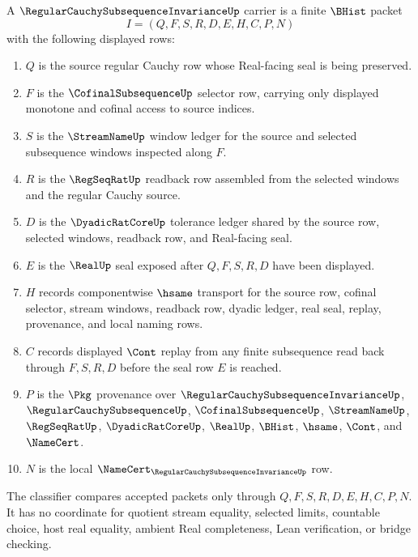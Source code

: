 \begin{definition}
\label{def:regular-cauchy-subsequence-invariance-carrier}
A $\RegularCauchySubsequenceInvarianceUp$ carrier is a finite $\BHist$ packet
$$
I=(Q,F,S,R,D,E,H,C,P,N)
$$
with the following displayed rows:
\begin{enumerate}
\item $Q$ is the source regular Cauchy row whose Real-facing seal is being preserved.
\item $F$ is the $\CofinalSubsequenceUp$ selector row, carrying only displayed monotone and cofinal access to source indices.
\item $S$ is the $\StreamNameUp$ window ledger for the source and selected subsequence windows inspected along $F$.
\item $R$ is the $\RegSeqRatUp$ readback row assembled from the selected windows and the regular Cauchy source.
\item $D$ is the $\DyadicRatCoreUp$ tolerance ledger shared by the source row, selected windows, readback row, and Real-facing seal.
\item $E$ is the $\RealUp$ seal exposed after $Q,F,S,R,D$ have been displayed.
\item $H$ records componentwise $\hsame$ transport for the source row, cofinal selector, stream windows, readback row, dyadic ledger, real seal, replay, provenance, and local naming rows.
\item $C$ records displayed $\Cont$ replay from any finite subsequence read back through $F,S,R,D$ before the seal row $E$ is reached.
\item $P$ is the $\Pkg$ provenance over $\RegularCauchySubsequenceInvarianceUp$, $\RegularCauchySubsequenceUp$, $\CofinalSubsequenceUp$, $\StreamNameUp$, $\RegSeqRatUp$, $\DyadicRatCoreUp$, $\RealUp$, $\BHist$, $\hsame$, $\Cont$, and $\NameCert$.
\item $N$ is the local $\NameCert_{\RegularCauchySubsequenceInvarianceUp}$ row.
\end{enumerate}
The classifier compares accepted packets only through $Q,F,S,R,D,E,H,C,P,N$. It has no coordinate for quotient stream equality, selected limits, countable choice, host real equality, ambient Real completeness, Lean verification, or bridge checking.
\end{definition}

